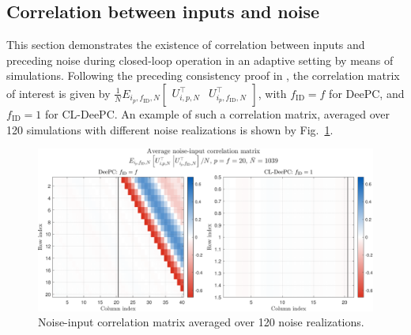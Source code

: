 \subsection{Correlation between inputs and noise}
This section demonstrates the existence of correlation between inputs and preceding noise during closed-loop operation in an adaptive setting by means of simulations. Following the preceding consistency proof in , the correlation matrix of interest is given by $\frac{1}{N}E_{i_p,f_\mathrm{ID},N}\begin{bmatrix}U_{i,p,N}^\top & U_{i_p,f_\mathrm{ID},N}^\top\end{bmatrix}$, with $f_\mathrm{ID}=f$ for \ac{DeePC}, and $f_\mathrm{ID}=1$ for \ac{CL-DeePC}. An example of such a correlation matrix, averaged over 120 simulations with different noise realizations is shown by Fig.~\ref{fig:EfUpf_correlation}.
\begin{figure}[b!]
\begin{center}
\includegraphics[width=\columnwidth]{results/figures/Correlation_Nbar_1039_p_20_f_20_Re_1_Ru_1_Rdu_0_Q_100_R_0_dR_10.pdf}    %
\caption{Noise-input correlation matrix averaged over 120 noise realizations.}  %
\label{fig:EfUpf_correlation}                                 %
\end{center}                                 %
\end{figure}
